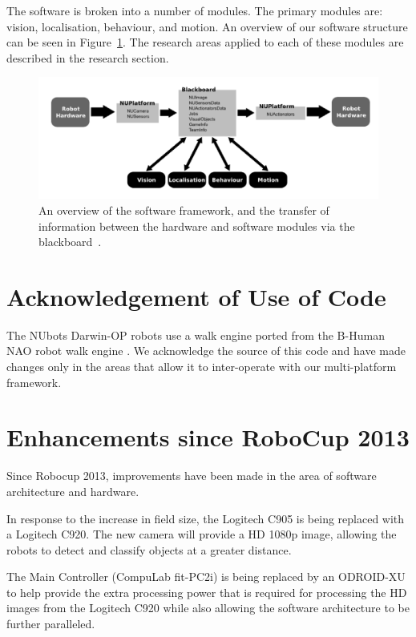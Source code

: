 \documentclass{llncs}
\begin{document}
The software is broken into a number of modules. The primary modules are: vision, localisation, behaviour, and motion. An overview of our software structure can be seen in Figure~\ref{fig:platform}. The research areas applied to each of these modules are described in the research section.

\begin{figure}[bht!]
\begin{center}
\includegraphics[width=1.0\textwidth]{Platform.png}
\caption{An overview of the software framework, and the transfer of information between the hardware and software modules via the blackboard~\cite{Kulk2011c}.}
\label{fig:platform}
\end{center}
\end{figure}


\section{Acknowledgement of Use of Code}
The NUbots Darwin-OP robots use a walk engine ported from the B-Human NAO robot walk engine \cite{BHumanWalk2010}. We acknowledge the source of this code and have made changes only in the areas that allow it to inter-operate with our multi-platform framework.

\section{Enhancements since RoboCup 2013}
Since Robocup 2013, improvements have been made in the area of software architecture and hardware. 

In response to the increase in field size, the Logitech C905 is being replaced with a Logitech C920. The new camera will provide a HD 1080p image, allowing the robots to detect and classify objects at a greater distance.

The Main Controller (CompuLab fit-PC2i) is being replaced by an ODROID-XU to help provide the extra processing power that is required for processing the HD images from the Logitech C920 while also allowing the software architecture to be further paralleled.
\end{document}
